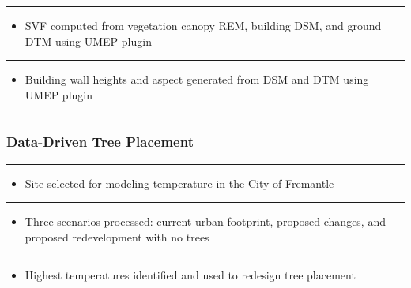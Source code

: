 \documentclass[
  letterpaper,
  DIV=11,
  numbers=noendperiod]{scrreprt}
\providecommand{\tightlist}{%
  \setlength{\itemsep}{0pt}\setlength{\parskip}{0pt}}\usepackage{longtable,booktabs,array}
\begin{document}
\begin{center}\rule{0.5\linewidth}{0.5pt}\end{center}

\begin{itemize}
\tightlist
\item
  SVF computed from vegetation canopy REM, building DSM, and ground DTM
  using UMEP plugin
\end{itemize}

\begin{center}\rule{0.5\linewidth}{0.5pt}\end{center}

\begin{itemize}
\tightlist
\item
  Building wall heights and aspect generated from DSM and DTM using UMEP
  plugin
\end{itemize}

\begin{center}\rule{0.5\linewidth}{0.5pt}\end{center}

\hypertarget{data-driven-tree-placement}{%
\subsubsection{Data-Driven Tree
Placement}\label{data-driven-tree-placement}}

\begin{center}\rule{0.5\linewidth}{0.5pt}\end{center}

\begin{itemize}
\tightlist
\item
  Site selected for modeling temperature in the City of Fremantle
\end{itemize}

\begin{center}\rule{0.5\linewidth}{0.5pt}\end{center}

\begin{itemize}
\tightlist
\item
  Three scenarios processed: current urban footprint, proposed changes,
  and proposed redevelopment with no trees
\end{itemize}

\begin{center}\rule{0.5\linewidth}{0.5pt}\end{center}

\begin{itemize}
\tightlist
\item
  Highest temperatures identified and used to redesign tree placement
\end{itemize}
\end{document}
